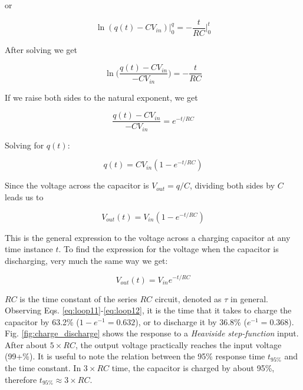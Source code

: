 or

\begin{equation}
\label{eq:loop7}
        \ln(q(t) - CV_{in})\Bigr|_{0}^{q} = - \frac{t}{RC}\Bigr|_{0}^{t}
\end{equation}

After solving we get

\begin{equation}
\label{eq:loop8}
        \ln\bigg(\frac{q(t) - CV_{in}}{-CV_{in}}\bigg) = - \frac{t}{RC}
\end{equation}

If we raise both sides to the natural exponent, we get

\begin{equation}
\label{eq:loop9}
        \frac{q(t) - CV_{in}}{-CV_{in}} = e^{-t/RC}
\end{equation}

Solving for $q(t)$:

\begin{equation}
\label{eq:loop10}
        q(t) = CV_{in}(1 - e^{-t/RC})
\end{equation}

Since the voltage across the capacitor is $V_{out} = q / C$, dividing both sides by $C$ leads us to

\begin{equation}
\label{eq:loop11}
        V_{out}(t) = V_{in}(1 - e^{-t/RC})
\end{equation}

This is the general expression to the voltage across a charging capacitor at any time instance $t$.
To find the expression for the voltage when the capacitor is discharging, very much the same way we get:

\begin{equation}
\label{eq:loop12}
        V_{out}(t) = V_{in}e^{-t/RC}
\end{equation}

$RC$ is the time constant of the series $RC$ circuit, denoted as $\tau$ in general.
Observing Eqs. \ref{eq:loop11}-\ref{eq:loop12}, it is the time that it takes to charge the capacitor by 63.2\% ($1 - e^{-1} = 0.632$), or to discharge it by 36.8\% ($e^{-1} = 0.368$).
Fig. \ref{fig:charge_discharge} shows the response to a \emph{Heaviside step-function} input.
After about $5 \times RC$, the output voltage practically reaches the input voltage (99+\%).
It is useful to note the relation between the 95\% response time $t_{95\%}$ and the time constant.
In $3 \times RC$ time, the capacitor is charged by about 95\%, therefore $t_{95\%} \approx 3\times RC$.

